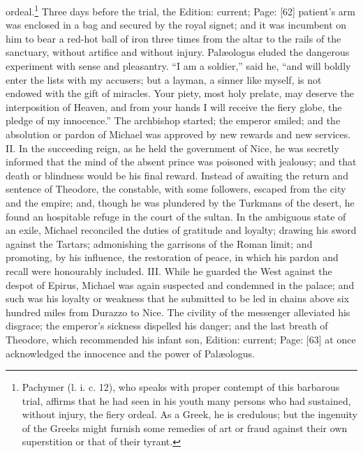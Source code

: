ordeal.\footnote{Pachymer (l. i. c. 12), who speaks with proper contempt of this barbarous trial, affirms that he had seen in his youth many persons who had sustained, without injury, the fiery ordeal. As a Greek, he is credulous; but the ingenuity of the Greeks might furnish some remedies of art or fraud against their own superstition or that of their tyrant.} Three days before the trial, the Edition: current; Page: [62] patient\texthebrew{}’s arm was enclosed in a bag and secured by the royal signet; and it was incumbent on him to bear a red-hot ball of iron three times from the altar to the rails of the sanctuary, without artifice and without injury. Palæologus eluded the dangerous experiment with sense and pleasantry. \texthebrew{“}I am a soldier,\texthebrew{}” said he, \texthebrew{“}and will boldly enter the lists with my accusers; but a layman, a sinner like myself, is not endowed with the gift of miracles. Your piety, most holy prelate, may deserve the interposition of Heaven, and from your hands I will receive the fiery globe, the pledge of my innocence.\texthebrew{}” The archbishop started; the emperor smiled; and the absolution or pardon of Michael was approved by new rewards and new services. II. In the succeeding reign, as he held the government of Nice, he was secretly informed that the mind of the absent prince was poisoned with jealousy; and that death or blindness would be his final reward. Instead of awaiting the return and sentence of Theodore, the constable, with some followers, escaped from the city and the empire; and, though he was plundered by the Turkmans of the desert, he found an hospitable refuge in the court of the sultan. In the ambiguous state of an exile, Michael reconciled the duties of gratitude and loyalty; drawing his sword against the Tartars; admonishing the garrisons of the Roman limit; and promoting, by his influence, the restoration of peace, in which his pardon and recall were honourably included. III. While he guarded the West against the despot of Epirus, Michael was again suspected and condemned in the palace; and such was his loyalty or weakness that he submitted to be led in chains above six hundred miles from Durazzo to Nice. The civility of the messenger alleviated his disgrace; the emperor\texthebrew{}’s sickness dispelled his danger; and the last breath of Theodore, which recommended his infant son, Edition: current; Page: [63] at once acknowledged the innocence and the power of Palæologus.

